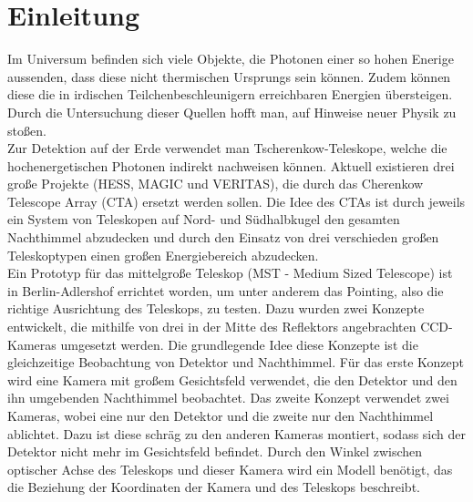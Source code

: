 \chapter{Einleitung}
Im Universum befinden sich viele Objekte, die Photonen einer so hohen Enerige aussenden, dass diese nicht thermischen Ursprungs sein können. Zudem können diese die in irdischen Teilchenbeschleunigern erreichbaren Energien übersteigen. Durch die Untersuchung dieser Quellen hofft man, auf Hinweise neuer Physik zu stoßen.\\
Zur Detektion auf der Erde verwendet man Tscherenkow-Teleskope, welche die hochenergetischen Photonen indirekt nachweisen können. Aktuell existieren drei große Projekte (HESS, MAGIC und VERITAS), die durch das Cherenkow Telescope Array (CTA) ersetzt werden sollen. Die Idee des CTAs ist durch jeweils ein System von Teleskopen auf Nord- und Südhalbkugel den gesamten Nachthimmel abzudecken und durch den Einsatz von drei verschieden großen Teleskoptypen einen großen Energiebereich abzudecken.\\
Ein Prototyp für das mittelgroße Teleskop (MST - Medium Sized Telescope) ist in Berlin-Adlershof errichtet worden, um unter anderem das Pointing, also die richtige Ausrichtung des Teleskops, zu testen. 
Dazu wurden zwei Konzepte entwickelt, die mithilfe von drei in der Mitte des Reflektors angebrachten CCD-Kameras umgesetzt werden. Die grundlegende Idee diese Konzepte ist die gleichzeitige Beobachtung von Detektor und Nachthimmel. Für das erste Konzept wird eine Kamera mit großem Gesichtsfeld verwendet, die den Detektor und den ihn umgebenden Nachthimmel beobachtet. Das zweite Konzept verwendet zwei Kameras, wobei eine nur den Detektor und die zweite nur den Nachthimmel ablichtet. Dazu ist diese schräg zu den anderen Kameras montiert, sodass sich der Detektor nicht mehr im Gesichtsfeld befindet. Durch den Winkel zwischen optischer Achse des Teleskops und dieser Kamera wird ein Modell benötigt, das die Beziehung der Koordinaten der Kamera und des Teleskops beschreibt.
